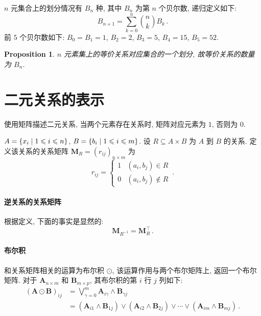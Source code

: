 \documentclass[UTF8]{ctexart}
\theoremstyle{mystyle}
\newtheorem{proposition}{Proposition}[section]
\theoremstyle{myremark}
\theoremstyle{plain}
\newcommand{\ve}[1]{\boldsymbol{\mathbf{#1}}}
\DeclarePairedDelimiter\set{\{}{\}}
\begin{document}
\begin{definition}
    $ n $ 元集合上的划分情况有 $ B_n $ 种, 其中 $ B_n $ 为第 $ n $ 个贝尔数, 递归定义如下: \[ B_{n+1} = \sum_{k=0}^{n} \binom{n}{k} B_k \,.\] 前 $ 5 $ 个贝尔数如下: $ B_0 = B_1 = 1 $, $ B_2 = 2 $, $ B_3 = 5 $, $ B_4 = 15 $, $ B_5 = 52 $.
\end{definition}


\begin{proposition}
    $ n $ 元素集上的等价关系对应集合的一个划分, 故等价关系的数量为 $ B_n $.
\end{proposition}

\section{二元关系的表示}
使用矩阵描述二元关系, 当两个元素存在关系时, 矩阵对应元素为 $ 1 $, 否则为 $ 0 $.
\begin{definition}
    $ A = \set{x_i \mid 1 \leqslant i \leqslant n} $, $ B = \set{b_i \mid 1 \leqslant i \leqslant m} $. 设 $ R \subseteq A \times B $ 为 $ A $ 到 $ B $ 的关系. 定义该关系的关系矩阵 $ \ve M_R = (r_{ij})_{n \times m} $ 为
    \[ r_{ij} = \begin{cases}
        1  & (a_i, b_j) \in R \\
        0  & (a_i, b_j) \notin R
    \end{cases} \,.\]
\end{definition}

\paragraph{逆关系的关系矩阵}
根据定义, 下面的事实是显然的:
\[ 
    \ve M_{R^{-1}} = \ve M_R^\top \,.
\]

\paragraph{布尔积}
和关系矩阵相关的运算为布尔积 $ \odot $, 该运算作用与两个布尔矩阵上, 返回一个布尔矩阵. 对于 $ \ve A_{n \times m} $ 和 $ \ve B_{m \times p} $, 其布尔积的第 $ i $ 行 $ j $ 列如下:
\begin{align*}
    (\ve A \odot \ve B)_{ij} &= \bigvee_{\gamma = 0}^{m} \ve A_{i \gamma} \land \ve B_{\gamma j} \\
    &= (\ve A_{i1} \land \ve B_{1j}) \lor (\ve A_{i2} \land \ve B_{2j}) \lor \cdots \lor (\ve A_{im} \land \ve B_{mj}) \,.
\end{align*}
\end{document}
